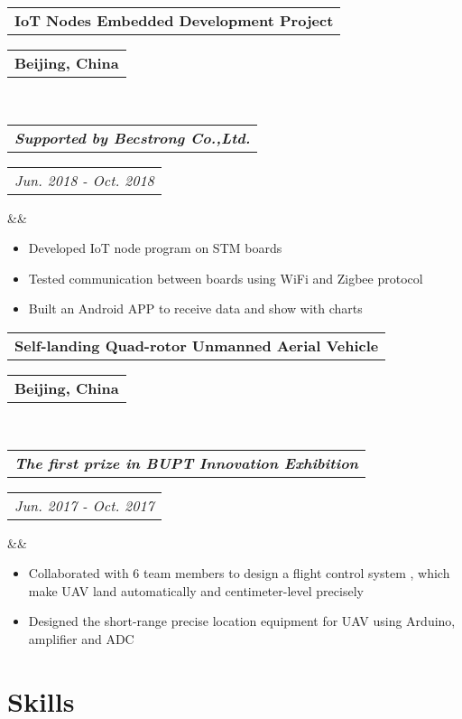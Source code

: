 \documentclass[11pt,a4paper,palatine]{moderncv}        %
\makeatletter
\newcommand*{\customcventry}[7][.25em]{
  \begin{tabular}{@{}l} 
    {\bfseries #4}
  \end{tabular}
  \hfill%
  \begin{tabular}{l@{}}
     {\bfseries #5}
  \end{tabular} \\
  \begin{tabular}{@{}l} 
    {\itshape #3}
  \end{tabular}
  \hfill%
  \begin{tabular}{l@{}}
     {\itshape #2}
  \end{tabular}
  \ifx&#7&%
  \else{\\%
    \begin{minipage}{\maincolumnwidth}%
      \small#7%
    \end{minipage}}\fi%
  \par\addvspace{#1}}
\makeatother
\begin{document}
\begin{CJK*}{UTF8}{gbsn}
\setlength{\parskip}{0.5em}

{\customcventry{Jun. 2018 - Oct. 2018}{\textbf{Supported by Becstrong Co.,Ltd.}}{IoT Nodes Embedded Development Project}{Beijing, China}{}{}}
  {\begin{itemize}
    \item Developed IoT node program on STM boards
    \item Tested communication between boards using WiFi and Zigbee protocol
    \item Built an Android APP to receive data and show with charts
  \end{itemize}
}

\setlength{\parskip}{0.5em}

{\customcventry{Jun. 2017 - Oct. 2017}{\textbf{The first prize in BUPT Innovation Exhibition}}{Self-landing Quad-rotor Unmanned Aerial Vehicle}{Beijing, China}{}{}}
  {\begin{itemize}
    \item Collaborated with 6 team members to design a flight control system , which make UAV land automatically and centimeter-level precisely
    \item Designed the short-range precise location equipment for UAV using Arduino, amplifier and ADC
  \end{itemize}
}

\section{Skills}



\end{CJK*}
\end{document}
